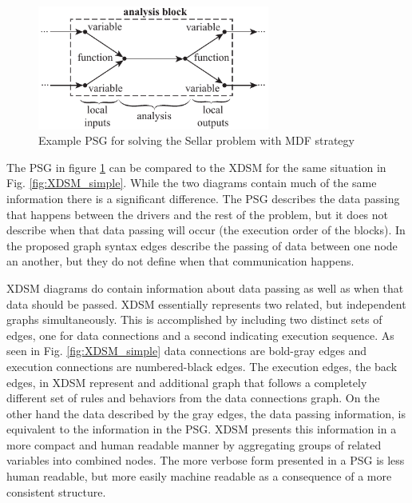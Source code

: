 \begin{figure}[htb]
    \begin{center}
    \includegraphics[width=3.0in]{images/sellar_mdf_psg}
    \end{center}
    \vspace{-10pt}
    \caption{Example PSG for solving the Sellar problem with MDF strategy}
    \label{f:sellar_psg}
\end{figure}

The PSG in figure \ref{f:sellar_psg} can be compared to the XDSM for the same situation 
in Fig. \ref{fig:XDSM_simple}. While the two diagrams contain much of the same information 
there is a significant difference. The PSG describes the data passing that happens between 
the drivers and the rest of the problem, but it does not describe when that data passing 
will occur (the execution order of the blocks). In the proposed graph syntax edges describe 
the passing of data between one node an another, but they do not define when that 
communication happens. 

XDSM diagrams do contain information about data passing as well as when that data should be passed. 
XDSM essentially represents two related, but independent graphs simultaneously. 
This is accomplished by including two distinct sets of edges, one for data 
connections and a second indicating execution sequence. As seen in Fig. \ref{fig:XDSM_simple}
data connections are bold-gray edges and execution connections are numbered-black edges. The
execution edges, the back edges, in XDSM represent and additional graph that
follows a completely different set of rules and behaviors from the data connections graph. 
On the other hand the data described by the gray edges, 
the data passing information, is equivalent to the information in the PSG. XDSM presents this 
information in a more compact and human readable manner by aggregating groups of related variables
into combined nodes. The more verbose form presented in a PSG is less human readable, but more easily 
machine readable as a consequence of a more consistent structure. 




